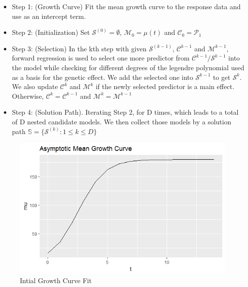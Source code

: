\documentclass[11pt,]{book}
\providecommand{\tightlist}{%
  \setlength{\itemsep}{0pt}\setlength{\parskip}{0pt}}
\theoremstyle{definition}
\theoremstyle{definition}
\theoremstyle{remark}
\begin{document}
\begin{itemize}
\tightlist
\item
  Step 1: (Growth Curve) Fit the mean growth curve to the response data
  and use as an intercept term.\\
\item
  Step 2: (Initialization) Set \(\mathcal{S}^{(0)} = \emptyset\),
  \(\mathcal{M}_0 = \mu(t)\) and \(\mathcal{C}_0 = \mathcal{P_1}\)
\item
  Step 3: (Selection) In the kth step with given
  \(\mathcal{S}^{(k-1)}\), \(\mathcal{C}^{k−1}\) and
  \(\mathcal{M}^{k−1}\), forward regression is used to select one more
  predictor from \(\mathcal{C}^{k−1}/ \mathcal{S}^{k−1}\) into the model
  while checking for different degrees of the legendre polynomial used
  as a basis for the genetic effect. We add the selected one into
  \(\mathcal{S}^{k−1}\) to get \(\mathcal{S}^k\). We also update
  \(\mathcal{C}^k\) and \(\mathcal{M}^k\) if the newly selected
  predictor is a main effect. Otherwise,
  \(\mathcal{C}^k = \mathcal{C}^{k−1}\) and
  \(\mathcal{M}^k = \mathcal{M}^{k−1}\)
\item
  Step 4: (Solution Path). Iterating Step 2, for D times, which leads to
  a total of D nested candidate models. We then collect those models by
  a solution path \(\mathbb{S}=\{\mathcal{S}^{(k)}: 1 \le k \le D\}\)
\end{itemize}

\begin{figure}

{\centering \includegraphics[width=0.8\linewidth]{images/GrowthCurveExample} 

}

\caption{Intial Growth Curve Fit}\label{fig:growth-example}
\end{figure}
\end{document}
